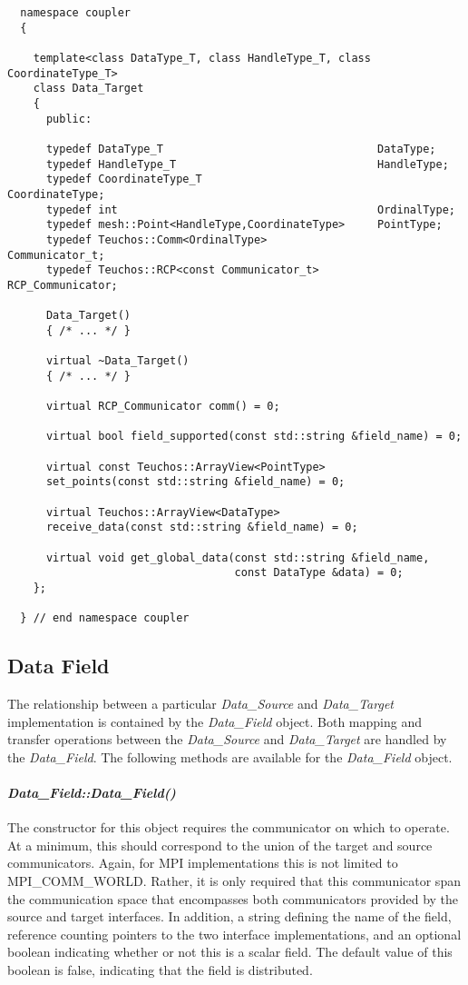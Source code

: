 \documentclass[letterpaper]{article}
\begin{document}
\begin{lstlisting}
  namespace coupler
  {

    template<class DataType_T, class HandleType_T, class CoordinateType_T>
    class Data_Target 
    {
      public:

      typedef DataType_T                                 DataType;
      typedef HandleType_T                               HandleType;
      typedef CoordinateType_T                           CoordinateType;
      typedef int                                        OrdinalType;
      typedef mesh::Point<HandleType,CoordinateType>     PointType;
      typedef Teuchos::Comm<OrdinalType>                 Communicator_t;
      typedef Teuchos::RCP<const Communicator_t>         RCP_Communicator;

      Data_Target()
      { /* ... */ }

      virtual ~Data_Target()
      { /* ... */ }

      virtual RCP_Communicator comm() = 0;

      virtual bool field_supported(const std::string &field_name) = 0;

      virtual const Teuchos::ArrayView<PointType> 
      set_points(const std::string &field_name) = 0;

      virtual Teuchos::ArrayView<DataType> 
      receive_data(const std::string &field_name) = 0;

      virtual void get_global_data(const std::string &field_name,
                                   const DataType &data) = 0;
    };

  } // end namespace coupler
\end{lstlisting}

\subsection{Data Field}

The relationship between a particular {\sl Data\_Source} and {\sl
  Data\_Target} implementation is contained by the {\sl Data\_Field}
object. Both mapping and transfer operations between the {\sl
  Data\_Source} and {\sl Data\_Target} are handled by the {\sl
  Data\_Field}. The following methods are available for the {\sl
  Data\_Field} object.

\paragraph{\sl Data\_Field::Data\_Field()}
The constructor for this object requires the communicator on which to
operate. At a minimum, this should correspond to the union of the
target and source communicators. Again, for MPI implementations this
is not limited to MPI\_COMM\_WORLD. Rather, it is only required that
this communicator span the communication space that encompasses both
communicators provided by the source and target interfaces. In
addition, a string defining the name of the field, reference counting
pointers to the two interface implementations, and an optional boolean
indicating whether or not this is a scalar field. The default value of
this boolean is false, indicating that the field is distributed.
\end{document}
